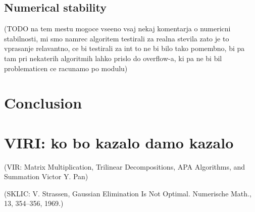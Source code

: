 \documentclass[a4paper,11pt]{article}
\begin{document}
\subsection{Numerical stability}
(TODO na tem mestu mogoce vseeno vsaj nekaj komentarja o numericni stabilnosti, mi smo namrec algoritem testirali za realna stevila zato je to vprasanje relavantno, ce bi testirali za int to ne bi bilo tako pomembno, bi pa tam pri nekaterih algoritmih lahko prislo do overflow-a, ki pa ne bi bil problematicen ce racunamo po modulu)

\section{Conclusion}



\section{VIRI: ko bo kazalo damo kazalo}

(VIR: Matrix Multiplication, Trilinear Decompositions,
APA Algorithms, and Summation
Victor Y. Pan)

(SKLIC: V. Strassen, Gaussian Elimination Is Not Optimal. Numerische Math., 13, 354–356,
1969.)
\end{document}
